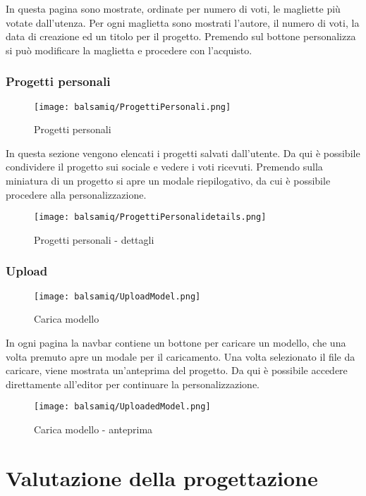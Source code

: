 \documentclass[12pt,italian,]{report}
\begin{document}
In questa pagina sono mostrate, ordinate per numero di voti, le
magliette più votate dall'utenza. Per ogni maglietta sono mostrati
l'autore, il numero di voti, la data di creazione ed un titolo per il
progetto. Premendo sul bottone personalizza si può modificare la
maglietta e procedere con l'acquisto.

\hypertarget{progetti-personali}{%
\subsection{Progetti personali}\label{progetti-personali}}

\begin{figure}
\centering
\texttt{[image: balsamiq/ProgettiPersonali.png]}
\caption{Progetti personali}
\end{figure}

In questa sezione vengono elencati i progetti salvati dall'utente. Da
qui è possibile condividere il progetto sui sociale e vedere i voti
ricevuti. Premendo sulla miniatura di un progetto si apre un modale
riepilogativo, da cui è possibile procedere alla personalizzazione.

\begin{figure}
\centering
\texttt{[image: balsamiq/ProgettiPersonalidetails.png]}
\caption{Progetti personali - dettagli}
\end{figure}

\hypertarget{upload}{%
\subsection{Upload}\label{upload}}

\begin{figure}
\centering
\texttt{[image: balsamiq/UploadModel.png]}
\caption{Carica modello}
\end{figure}

In ogni pagina la navbar contiene un bottone per caricare un modello,
che una volta premuto apre un modale per il caricamento. Una volta
selezionato il file da caricare, viene mostrata un'anteprima del
progetto. Da qui è possibile accedere direttamente all'editor per
continuare la personalizzazione.

\begin{figure}
\centering
\texttt{[image: balsamiq/UploadedModel.png]}
\caption{Carica modello - anteprima}
\end{figure}

\hypertarget{valutazione-della-progettazione}{%
\chapter{Valutazione della
progettazione}\label{valutazione-della-progettazione}}
\end{document}
